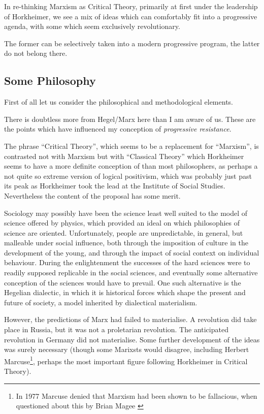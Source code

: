\documentclass[10pt,titlepage]{article}
\begin{document}
In re-thinking Marxism as Critical Theory, primarily at first under the leadership of Horkheimer, we see a mix of ideas which can comfortably fit into a progressive agenda, with some which seem exclusively revolutionary.

The former can be selectively taken into a modern progressive program, the latter do not belong there.

\subsection{Some Philosophy}

First of all let us consider the philosophical and methodological elements.

There is doubtless more from Hegel/Marx here than I am aware of us.
These are the points which have influenced my conception of \emph{progressive resistance}.

The phrase ``Critical Theory'', which seems to be a replacement for ``Marxism'', is contrasted not with Marxism but with ``Classical Theory'' which Horkheimer seems to have a more definite conception of than most philosophers, as perhaps a not quite so extreme version of logical positivism, which was probably just past its peak as Horkheimer took the lead at the Institute of Social Studies.
Nevertheless the content of the proposal has some merit.

Sociology may possibly have been the science least well suited to the model of science offered by physics, which provided an ideal on which philosophies of science are oriented.
Unfortunately, people are unpredictable, in general, but malleable under social influence, both through the imposition of culture in the development of the young, and through the impact of social context on individual behaviour.
During the enlightenment the successes of the hard sciences were to readily supposed replicable in the social sciences, and eventually some alternative conception of the sciences would have to prevail.
One such alternative is the Hegelian dialectic, in which it is historical forces which shape the present and future of society, a model inherited by dialectical materialism.

However, the predictions of Marx had failed to materialise.
A revolution did take place in Russia, but it was not a proletarian revolution.
The anticipated revolution in Germany did not materialise.
Some further development of the ideas was surely necessary (though some Marixsts would disagree, including Herbert Marcuse\footnote{
 In 1977 Marcuse denied that Marxism had been shown to be fallacious, when questioned about this by Brian Magee \cite{magee-marcuse}}, perhaps the most important figure following Horkheimer in Critical Theory).
\end{document}
